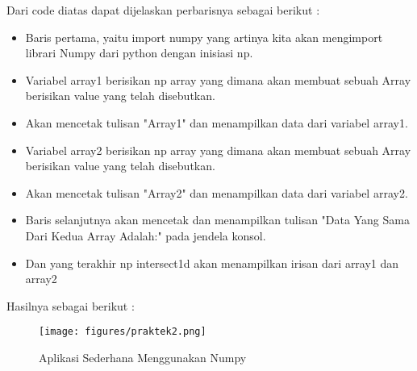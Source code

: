 Dari code diatas dapat dijelaskan perbarisnya sebagai berikut :
\begin{itemize}
\item
Baris pertama, yaitu import numpy yang artinya kita akan mengimport librari Numpy dari python dengan inisiasi np.
\item
Variabel array1 berisikan np array yang dimana akan membuat sebuah Array berisikan value yang telah disebutkan.
\item
Akan mencetak tulisan "Array1" dan menampilkan data dari variabel array1.
\item
Variabel array2 berisikan np array yang dimana akan membuat sebuah Array berisikan value yang telah disebutkan.
\item
Akan mencetak tulisan "Array2" dan menampilkan data dari variabel array2.
\item
Baris selanjutnya akan mencetak dan menampilkan tulisan "Data Yang Sama Dari Kedua Array Adalah:" pada jendela konsol.
\item
Dan yang terakhir np intersect1d akan menampilkan irisan dari array1 dan array2
\end{itemize}

Hasilnya sebagai berikut :
\begin{figure}[ht]
\centering
\texttt{[image: figures/praktek2.png]}
\caption{Aplikasi Sederhana Menggunakan Numpy}
\label{Praktek}
\end{figure}
